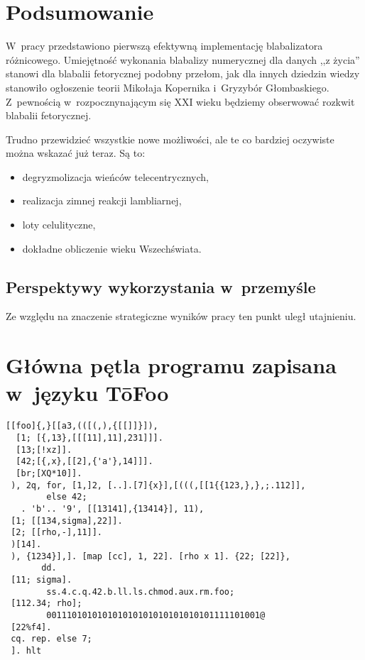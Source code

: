 \documentclass[licencjacka,en]{pracamgr}
\begin{document}
\chapter{Podsumowanie}

W~pracy przedstawiono pierwszą efektywną implementację blabalizatora
różnicowego.  Umiejętność wykonania blabalizy numerycznej dla danych
,,z życia'' stanowi dla blabalii fetorycznej podobny przełom, jak dla
innych dziedzin wiedzy stanowiło ogłoszenie teorii Mikołaja Kopernika
i~Gryzybór Głombaskiego.  Z~pewnością w~rozpocznynającym się XXI wieku
będziemy obserwować rozkwit blabalii fetorycznej.

Trudno przewidzieć wszystkie nowe możliwości, ale te co bardziej
oczywiste można wskazać już teraz.  Są to:
\begin{itemize}
  \item degryzmolizacja wieńców telecentrycznych,
  \item realizacja zimnej reakcji lambliarnej,
  \item loty celulityczne,
  \item dokładne obliczenie wieku Wszechświata.
\end{itemize}

\section{Perspektywy wykorzystania w~przemyśle}

Ze względu na znaczenie strategiczne wyników pracy ten punkt uległ
utajnieniu.

\appendix

\chapter{Główna pętla programu zapisana w~języku T\=oFoo}

\begin{verbatim}
[[foo]{,}[[a3,(([(,),{[[]]}]),
  [1; [{,13},[[[11],11],231]]].
  [13;[!xz]].
  [42;[{,x},[[2],{'a'},14]]].
  [br;[XQ*10]].
 ), 2q, for, [1,]2, [..].[7]{x}],[(((,[[1{{123,},},;.112]],
        else 42;
   . 'b'.. '9', [[13141],{13414}], 11),
 [1; [[134,sigma],22]].
 [2; [[rho,-],11]].
 )[14].
 ), {1234}],]. [map [cc], 1, 22]. [rho x 1]. {22; [22]},
       dd.
 [11; sigma].
        ss.4.c.q.42.b.ll.ls.chmod.aux.rm.foo;
 [112.34; rho];
        001110101010101010101010101010101111101001@
 [22%f4].
 cq. rep. else 7;
 ]. hlt
\end{verbatim}
\end{document}
